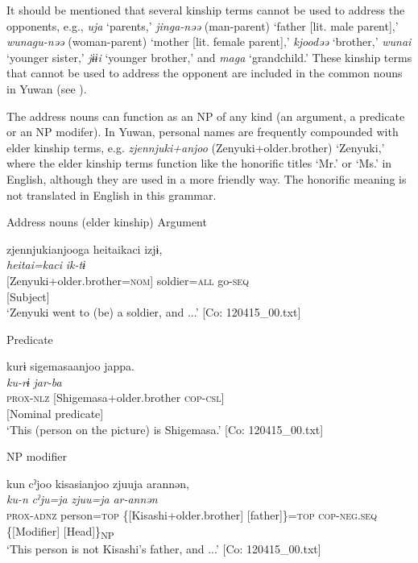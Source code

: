 It should be mentioned that several kinship terms cannot be used to address the opponents, e.g., \textit{uja} ‘parents,’ \textit{jinga-nəə} (man-parent) ‘father [lit. male parent],’ \textit{wunagu-nəə} (woman-parent) ‘mother [lit. female parent],’ \textit{kjoodəə} ‘brother,’ \textit{wunai} ‘younger sister,’ \textit{jɨɨi} ‘younger brother,’ and \textit{maga} ‘grandchild.’ These kinship terms that cannot be used to address the opponent are included in the common nouns in Yuwan (see ).

The address nouns can function as an NP of any kind (an argument, a predicate or an NP modifer). In Yuwan, personal names are frequently compounded with elder kinship terms, e.g. \textit{zjennjuki+anjoo} (Zenyuki+older.brother) ‘Zenyuki,’ where the elder kinship terms function like the honorific titles ‘Mr.’ or ‘Ms.’ in English, although they are used in a more friendly way. The honorific meaning is not translated in English in this grammar.

\ea \label{ex:7:6}  Address nouns (elder kinship)
\ea \label{ex:7:6a}Argument

{\TM}
\gllll  zjennjukianjooga  {\textbar}heitai{\textbar}kaci  izjɨ,\\
\textit{}  \textit{heitai=kaci}  \textit{ik-tɨ}\\
{}[Zenyuki+older.brother=\textsc{nom}]  soldier=\textsc{all}  go-\textsc{seq}\\
{}[Subject]    \\
\glt ‘Zenyuki went to (be) a soldier, and ...’ [Co: 120415\_00.txt]

\ex \label{ex:7:6b}Predicate

{\TM}
\gllll  kurɨ  sigemasaanjoo  jappa.\\
\textit{ku-rɨ}  \textit{}  \textit{jar-ba}\\
\textsc{prox}-\textsc{nlz}  [Shigemasa+older.brother  \textsc{cop}-\textsc{csl}]\\
{}[Nominal predicate]  \\
\glt ‘This (person on the picture) is Shigemasa.’ [Co: 120415\_00.txt]

\ex \label{ex:7:6c}NP modifier

  {\TM}
\glll kun  cˀjoo  kisasianjoo  zjuuja  arannən,\\
\textit{ku-n}  \textit{cˀju=ja}  \textit{}  \textit{zjuu=ja} \textit{ar-annən}\\
      \textsc{prox}-\textsc{adnz}  person=\textsc{top}  \{[Kisashi+older.brother]  [father]\}=\textsc{top}         \textsc{cop}-\textsc{neg}.\textsc{seq}\\
          \{[Modifier]  [Head]\}\textsubscript{NP}\\
\glt    ‘This person is not Kisashi’s father, and ...’       [Co: 120415\_00.txt]

